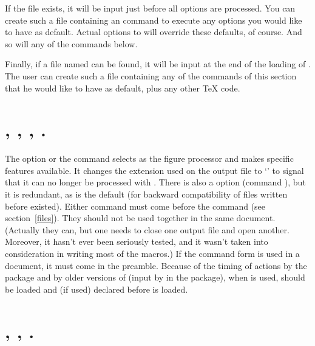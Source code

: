 \documentclass[letterpaper]{article}
\begin{document}
If the file  exists, it will be input just before all
options are processed. You can create such a file containing an
 command to execute any options you would like to
have as default. Actual options to  will override these
defaults, of course. And so will any of the commands below.

Finally, if a file named  can be found, it will be input
at the end of the loading of \mfp{}. The user can create such a file
containing any of the commands of this section that he would like to
have as default, plus any other \TeX{} code.


\section{, , , .}%
\label{metapost}%

The option  or the command  selects \MP{}
as the figure processor and makes specific features available. It
changes the extension used on the output file to `' to signal
that it can no longer be processed with \MF{}. There is also a
 option (command ), but it is redundant,
as \MF{} is the default (for backward compatibility of files written
before \MP{} existed). Either command must come before the
 command (see section~\ref{files}). They should not
be used together in the same document. (Actually they can, but one needs
to close one output file and open another. Moreover, it hasn't ever been
seriously tested, and it wasn't taken into consideration in writing most
of the macros.) If the command form  is used in a
\LaTeXe{} document, it must come in the preamble. Because of the timing
of actions by the  package and by older versions of
 (input by  in the 
package), when \pdfLaTeX{} is used, \mfp{} should be loaded and
 (if used) declared before  is loaded.


\section{, ,
.}\label{mplabels}
%
%
\end{document}
